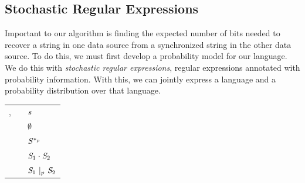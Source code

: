 \documentclass[acmsmall,screen,anonymous]{acmart}
\begin{document}
\subsection{Stochastic Regular Expressions}
\label{subsec:stoch-rx}
Important to our algorithm is finding the expected number of bits needed to
recover a string in one data source from a synchronized string in the other data
source. To do this, we must first develop a probability model for our language.
We do this with \emph{stochastic regular expressions}, regular expressions
annotated with probability information. With this, we can jointly express a
language and a probability distribution over that language.

\begin{center}
  \begin{tabular}{rcl}
    \Regex{},\RegexAlt{}
    & \GEq{} & $\String$ \\
    & \GBar{} & $\emptyset$ \\
    & \GBar{} & $\PRegexStar{\Regex}{p}$ \\
    & \GBar{} & $\RegexConcat{\Regex_1}{\Regex_2}$ \\
    & \GBar{} & $\PRegexOr{\Regex_1}{\Regex_2}{p}$
  \end{tabular}
\end{center}
\end{document}
